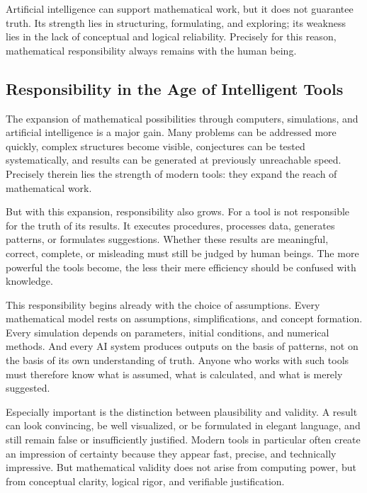 \begin{DidacticBox}
	\label{box:ai-truth}
	Artificial intelligence can support mathematical work,
	but it does not guarantee truth.
	Its strength lies in structuring, formulating, and exploring;
	its weakness lies in the lack of conceptual and logical reliability.
	Precisely for this reason, mathematical responsibility always remains with the human being.
\end{DidacticBox}


\subsection{Responsibility in the Age of Intelligent Tools}

The expansion of mathematical possibilities through computers,
simulations,
and artificial intelligence is a major gain.
Many problems can be addressed more quickly,
complex structures become visible,
conjectures can be tested systematically,
and results can be generated at previously unreachable speed.
Precisely therein lies the strength of modern tools:
they expand the reach of mathematical work.

But with this expansion, responsibility also grows.
For a tool is not responsible for the truth of its results.
It executes procedures,
processes data,
generates patterns,
or formulates suggestions.
Whether these results are meaningful,
correct,
complete,
or misleading
must still be judged by human beings.
The more powerful the tools become,
the less their mere efficiency should be confused with knowledge.

This responsibility begins already with the choice of assumptions.
Every mathematical model rests on assumptions,
simplifications,
and concept formation.
Every simulation depends on parameters,
initial conditions,
and numerical methods.
And every AI system produces outputs on the basis of patterns,
not on the basis of its own understanding of truth.
Anyone who works with such tools must therefore know
what is assumed,
what is calculated,
and what is merely suggested.

Especially important is the distinction between plausibility and validity.
A result can look convincing,
be well visualized,
or be formulated in elegant language,
and still remain false or insufficiently justified.
Modern tools in particular often create an impression of certainty
because they appear fast,
precise,
and technically impressive.
But mathematical validity does not arise from computing power,
but from conceptual clarity,
logical rigor,
and verifiable justification.

